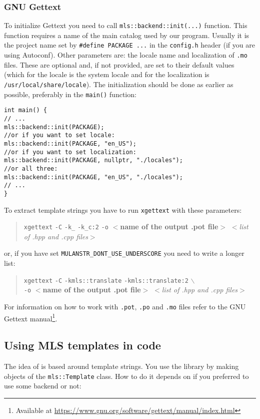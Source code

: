 \subsubsection{GNU Gettext}
To initialize Gettext you need to call \verb+mls::backend::init(...)+ function. 
This function requires a name of the main catalog used by our program. Usually it is the project name set by \verb+#define PACKAGE ...+ in the \texttt{config.h} header (if you are using Autoconf).
Other parameters are: the locale name and localization of \texttt{.mo} files. These are optional and, if not provided, are set to their default values (which for the locale is the system locale 
and for the localization is \texttt{/usr/local/share/locale}). The initialization should be done as earlier as possible, preferably in the \verb+main()+ function:
\begin{verbatim}
int main() {
// ...
mls::backend::init(PACKAGE);
//or if you want to set locale:
mls::backend::init(PACKAGE, "en_US");
//or if you want to set localization:
mls::backend::init(PACKAGE, nullptr, "./locales");
//or all three:
mls::backend::init(PACKAGE, "en_US", "./locales");
// ...
}
\end{verbatim}

To extract template strings you have to run \texttt{xgettext} with these parameters: 
\begin{quote}
	\texttt{xgettext} \verb+-C+ \verb+-k_+ \verb+-k_c:2+ \texttt{-o} $<$\textbf{name of the output .pot file}$>$ $<$\textit{list of .hpp and .cpp files}$>$
\end{quote}
or, if you have set \verb+MULANSTR_DONT_USE_UNDERSCORE+ you need to write a longer list:
\begin{quote}
	\texttt{xgettext} \verb+-C+ \verb+-kmls::translate+ \verb+-kmls::translate:2+ $\backslash$ \\ \texttt{-o} $<$\textbf{name of the output .pot file}$>$ $<$\textit{list of .hpp and .cpp files}$>$
\end{quote}

For information on how to work with \texttt{.pot}, \texttt{.po} and \texttt{.mo} files refer to the GNU Gettext manual\footnote{Available at \url{https://www.gnu.org/software/gettext/manual/index.html}}.

\subsection{Using MLS templates in code}
The idea of \mulan{} is based around template strings. You use the library by making objects of the \verb+mls::Template+ class.
How to do it depends on if you preferred to use some backend or not:

